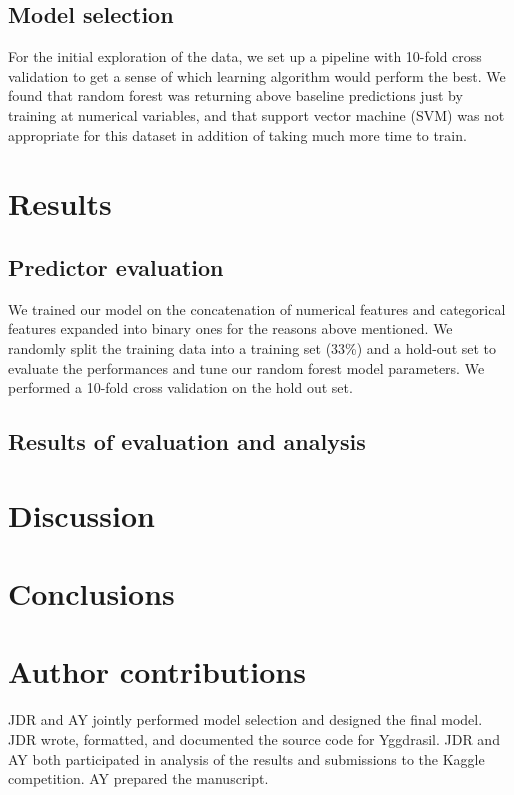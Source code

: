 \documentclass[11pt,a4paper]{article}
\begin{document}
\subsection{Model selection}

For the initial exploration of the data, we set up a pipeline with 10-fold cross validation to get a sense of which learning algorithm would perform the best. We found that random forest was returning above baseline predictions just by training at numerical variables, and that support vector machine (SVM) was not appropriate for this dataset in addition of taking much more time to train.
  
\section{Results}

\subsection{Predictor evaluation}

We trained our model on the concatenation of numerical features and categorical features expanded into binary ones for the reasons above mentioned. We randomly split the training data into a training set (33\%) and a hold-out set to evaluate the performances and tune our random forest model parameters. We performed a 10-fold cross validation on the hold out set.

\subsection{Results of evaluation and analysis}

\section{Discussion}

\section{Conclusions}

\section{Author contributions}
JDR and AY jointly performed model selection and designed the final model. JDR wrote, formatted, and documented the source code for Yggdrasil. JDR and AY both participated in analysis of the results and submissions to the Kaggle competition. AY prepared the manuscript.
\end{document}
